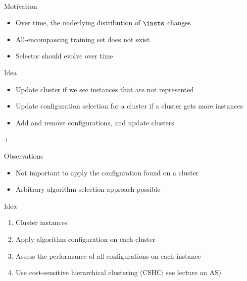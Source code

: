 \begin{frame}[c]{\eisac{}~}

\begin{block}{Motivation}
\begin{itemize}
  \item Over time, the underlying distribution of $\insts$ changes
  \item All-encompassing training set does not exist
  \item Selector should evolve over time
\end{itemize}
\end{block}

\bigskip
\pause

\begin{block}{Idea}
\begin{itemize}
  \item Update cluster if we see instances that are not represented 
  \item Update configuration selection for a cluster if a cluster gets more instances
  \item Add and remove configurations, and update clusters
\end{itemize}
\end{block}

\end{frame}
\begin{frame}[c]{\isac{}+ }

\begin{block}{Observations}
\begin{itemize}
  \item Not important to apply the configuration found on a cluster
  \item Arbitrary algorithm selection approach possible 
\end{itemize}
\end{block}

\pause
\medskip

\begin{block}{Idea}
\begin{enumerate}
  \item Cluster instances
  \item Apply algorithm configuration on each cluster
  \item Assess the performance of all configurations on each instance
  \item Use cost-sensitive hierarchical clustering (CSHC; see lecture on AS)
\end{enumerate}
\end{block}

\end{frame}
